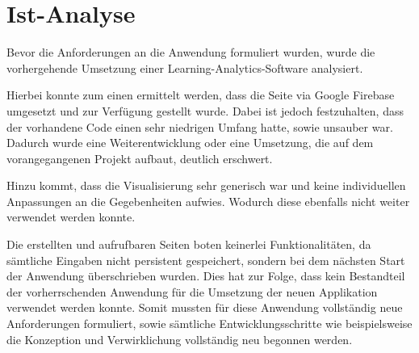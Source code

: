 \section{Ist-Analyse}
\label{sec:IstAnalyse}

Bevor die Anforderungen an die Anwendung formuliert wurden, wurde die vorhergehende Umsetzung einer Learning-Analytics-Software analysiert.

Hierbei konnte zum einen ermittelt werden, dass die Seite via Google Firebase umgesetzt und zur Verfügung gestellt wurde.
Dabei ist jedoch festzuhalten, dass der vorhandene Code einen sehr niedrigen Umfang hatte, sowie unsauber war.
Dadurch wurde eine Weiterentwicklung oder eine Umsetzung, die auf dem vorangegangenen Projekt aufbaut, deutlich erschwert.

Hinzu kommt, dass die Visualisierung sehr generisch war und keine individuellen Anpassungen an die Gegebenheiten aufwies. Wodurch diese ebenfalls nicht weiter verwendet werden konnte.

Die erstellten und aufrufbaren Seiten boten keinerlei Funktionalitäten, da sämtliche Eingaben nicht persistent gespeichert, sondern bei dem nächsten Start der Anwendung überschrieben wurden.
Dies hat zur Folge, dass kein Bestandteil der vorherrschenden Anwendung für die Umsetzung der neuen Applikation verwendet werden konnte.
Somit mussten für diese Anwendung vollständig neue Anforderungen formuliert, sowie sämtliche Entwicklungsschritte wie beispielsweise die Konzeption und Verwirklichung vollständig neu begonnen werden.
